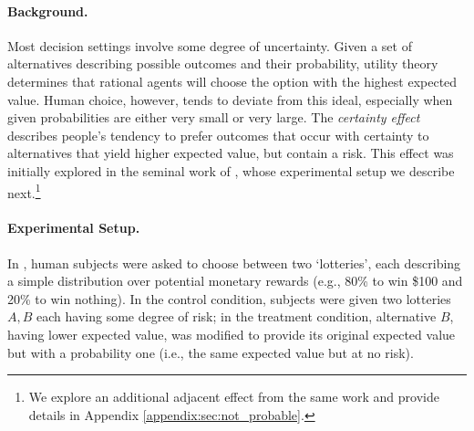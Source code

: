 \paragraph{Background.} Most decision settings involve some degree of uncertainty.
Given a set of alternatives describing possible outcomes and their probability,
utility theory \citep{friedman1948utility}
determines that rational agents will choose the option with the highest expected value.
Human choice, however, tends to deviate from this ideal,
especially when given probabilities are either very small or very large.
%
%
The \emph{certainty effect} describes people's tendency to prefer outcomes that occur with certainty to alternatives that yield higher expected value, but contain a risk.
This effect was initially explored in the seminal work of \citet{kahneman1979prospect},
whose experimental setup we describe next.\footnote{We explore an additional adjacent effect from the same work and provide details in Appendix \ref{appendix:sec:not_probable}.}



\paragraph{Experimental Setup.}
In \citet{kahneman1979prospect}, human subjects were asked to choose between
two `lotteries', each describing a simple distribution over potential monetary rewards
(e.g., 80\% to win \$100 and 20\% to win nothing).
In the control condition, subjects were given two lotteries $A,B$ each having some degree of risk;
in the treatment condition, alternative $B$, having lower expected value,
was modified to provide its original expected value but with a probability one
(i.e., the same expected value but at no risk).

